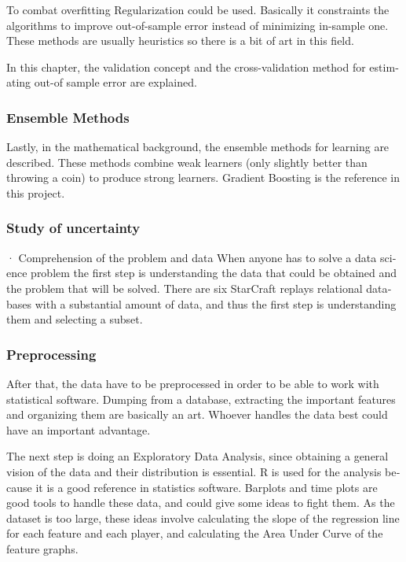 \begin{otherlanguage}{british}
  To combat overfitting Regularization could be used. Basically it constraints the algorithms to improve out-of-sample error instead of minimizing in-sample one. These methods are usually heuristics so there is a bit of art in this field.

  In this chapter, the validation concept and the cross-validation method for estimating out-of sample error are explained.


  \subsubsection*{Ensemble Methods}

  Lastly, in the mathematical background, the ensemble methods for learning are described. These methods combine weak learners (only slightly better than throwing a coin) to produce strong learners. Gradient Boosting is the reference in this project.

  \subsubsection*{Study of uncertainty}

  · Comprehension of the problem and data
  When anyone has to solve a data science problem the first step is understanding the data that could be obtained and the problem that will be solved. There are six StarCraft replays relational databases with a substantial amount of data, and thus the first step is understanding them and selecting a subset.

  \subsubsection*{Preprocessing}
  After that, the data have to be preprocessed in order to be able to work with statistical software. Dumping from a database, extracting the important features and organizing them are basically an art. Whoever handles the data best could have an important advantage.

  The next step is doing an Exploratory Data Analysis, since obtaining a general vision of the data and their distribution is essential. R is used for the analysis because it is a good reference in statistics software. Barplots and time plots are good tools to handle these data, and could give some ideas to fight them. As the dataset is too large, these ideas involve calculating the slope of the regression line for each feature and each player, and calculating the Area Under Curve of the feature graphs.


\end{otherlanguage}
